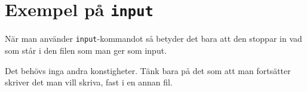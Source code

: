 \section{Exempel på \texttt{input}}
När man använder \texttt{input}-kommandot så betyder det bara att den stoppar in vad som står i den filen som man ger som input.

Det behövs inga andra konstigheter. Tänk bara på det som att man fortsätter skriver det man vill skriva, fast i en annan fil.
